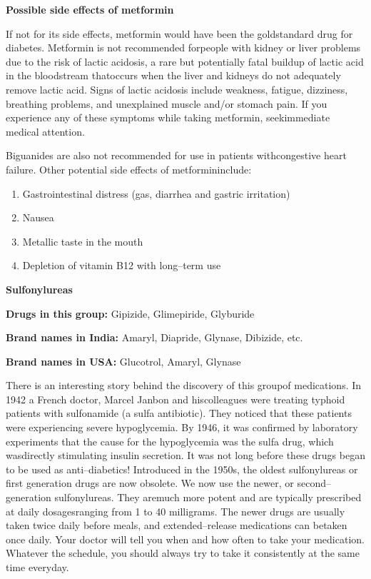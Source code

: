\clearpage

\noindent\textbf{Possible side effects of metformin}

If not for its side effects, metformin would have been the gold\break standard drug for diabetes. Metformin is not recommended for\break people with kidney or liver problems due to the risk of lactic acidosis, a rare but potentially fatal buildup of lactic acid in the bloodstream that\break occurs when the liver and kidneys do not adequately remove lactic acid. Signs of lactic acidosis include weakness, fatigue, dizziness, brea\-thing problems, and unexplained muscle and/or stomach pain. If you experience any of these symptoms while taking metformin, seek\break immediate medical attention.

Biguanides are also not recommended for use in patients with\break congestive heart failure. Other potential side effects of metformin\break include:

\begin{enumerate}[•]
\itemsep=0pt
\item Gastrointestinal distress (gas, diarrhea and gastric irritation)
\item Nausea
\item Metallic taste in the mouth
\item Depletion of vitamin B12 with long–term use
\end{enumerate}

\textbf{Sulfonylureas}

\textbf{Drugs in this group:} Gipizide, Glimepiride, Glyburide

\textbf{Brand names in India:} Amaryl, Diapride, Glynase, Dibizide, etc.

\textbf{Brand names in USA:} Glucotrol, Amaryl, Glynase

There is an interesting story behind the discovery of this group\break of medications. In 1942 a French doctor, Marcel Janbon and his\break colleagues were treating typhoid patients with sulfonamide (a sulfa anti\-biotic). They noticed that these patients were experiencing severe hypoglycemia. By 1946, it was confirmed by laboratory experiments that the cause for the hypoglycemia was the sulfa drug, which was\break directly stimulating insulin secretion. It was not long before these drugs began to be used as anti–diabetics! Introduced in the 1950s, the oldest sulfonylureas or first generation drugs are now obsolete. We now use the newer, or second–generation sulfonylureas. They are\break much more potent and are typically prescribed at daily dosages\break ranging from 1 to 40 milligrams. The newer drugs are usually taken twice daily before meals, and extended–release medications can be\break taken once daily. Your doctor will tell you when and how often to take your medication. Whatever the schedule, you should always try to take it consistently at the same time everyday.

